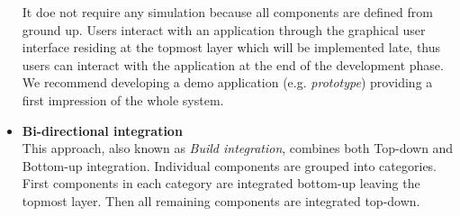 \documentclass[12pt, notitlepage]{article}
\begin{document}
\begin{itemize}
	It doe not require any simulation because all components are defined from ground up. Users interact with an application through the graphical user
	interface residing at the topmost layer which will be implemented late, thus users can interact with the application at the end of the development phase. 
	We recommend developing a demo application (e.g. \textit{prototype}) providing a first impression of the whole system.
	\item \textbf{Bi-directional integration}\cite{sw-testing-quality-assurance}\\
	This approach, also known as \textit{Build integration}\cite{schattenbest}, combines both Top-down and Bottom-up integration. 
	Individual components are grouped into categories. First components in each category are integrated bottom-up leaving the topmost layer.
	Then all remaining components are integrated top-down.
\end{itemize}
\end{document}
